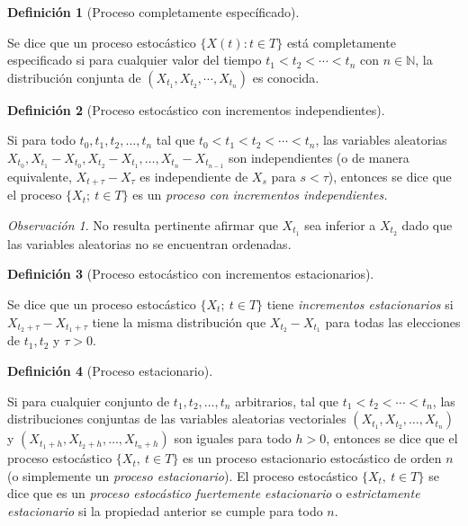 \documentclass[
  us-letterpaper,
]{scrreprt}
\theoremstyle{plain}
\theoremstyle{definition}
\newtheorem{definition}{Definición}[chapter]
\theoremstyle{definition}
\theoremstyle{plain}
\theoremstyle{remark}
\newtheorem*{remark}{Observación}
\begin{document}
\begin{definition}[Proceso completamente
específicado]\protect\hypertarget{def-pcesp}{}\label{def-pcesp}

Se dice que un proceso estocástico \(\{X(t): t\in T\}\) está
completamente especificado si para cualquier valor del tiempo
\(t_1<t_2<\cdots<t_n\) con \(n\in\mathbb N\), la distribución conjunta
de \((X_{t_1}, X_{t_2},\cdots,X_{t_n})\) es conocida.

\end{definition}

\begin{definition}[Proceso estocástico con incrementos
independientes]\protect\hypertarget{def-incind}{}\label{def-incind}

Si para todo \(t_0,t_1,t_2,\ldots,t_n\) tal que
\(t_0<t_1<t_2<\cdots<t_n\), las variables aleatorias
\(X_{t_0}, X_{t_1}-X_{t_0}, X_{t_2}-X_{t_1},\ldots,X_{t_n}-X_{t_{n-1}}\)
son independientes (o de manera equivalente, \(X_{t+\tau}-X_\tau\) es
independiente de \(X_s\) para \(s< \tau\)), entonces se dice que el
proceso \(\{X_t;\ t\in T\}\) es un \emph{proceso con incrementos
independientes.}

\end{definition}

\begin{remark}
No resulta pertinente afirmar que \(X_{t_1}\) sea inferior a \(X_{t_2}\)
dado que las variables aleatorias no se encuentran ordenadas.
\end{remark}

\begin{definition}[Proceso estocástico con incrementos
estacionarios]\protect\hypertarget{def-incest}{}\label{def-incest}

Se dice que un proceso estocástico \(\{X_t;\ t\in T\}\) tiene
\emph{incrementos estacionarios} si \(X_{t_2+\tau}-X_{t_1+\tau}\) tiene
la misma distribución que \(X_{t_2}-X_{t_1}\) para todas las elecciones
de \(t_1,t_2\) y \(\tau>0\).

\end{definition}

\begin{definition}[Proceso
estacionario]\protect\hypertarget{def-procesoest}{}\label{def-procesoest}

Si para cualquier conjunto de \(t_1, t_2, \ldots , t_n\) arbitrarios,
tal que \(t_1< t_2 < \cdots < t_n\), las distribuciones conjuntas de las
variables aleatorias vectoriales \((X_{t_1}, X_{t_2},\ldots, X_{t_n})\)
y \((X_{t_1+h}, X_{t_2+h},\ldots , X_{t_n+h})\) son iguales para todo
\(h > 0\), entonces se dice que el proceso estocástico
\(\{X_t,\ t \in T\}\) es un proceso estacionario estocástico de orden
\(n\) (o simplemente un \emph{proceso estacionario}). El proceso
estocástico \(\{X_t,\ t \in T\}\) se dice que es un \emph{proceso
estocástico fuertemente estacionario} o e\emph{strictamente
estacionario} si la propiedad anterior se cumple para todo \(n\).

\end{definition}
\end{document}
